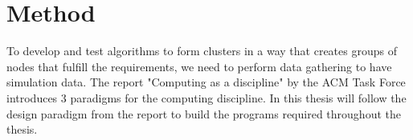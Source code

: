 %
%

\section{Method}
To develop and test algorithms to form clusters in a way that creates groups of nodes that fulfill the requirements, we need to perform data gathering to have simulation
data. The report "Computing as a discipline" by the ACM Task Force \cite{Denning} introduces 3 paradigms for the computing discipline. In this thesis will follow the design paradigm from the report
to build the programs required throughout the thesis.

